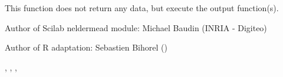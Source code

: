 %
\begin{Value}
This function does not return any data, but execute the output function(s).
\end{Value}
%
\begin{Author}\relax
Author of Scilab neldermead module: Michael Baudin (INRIA - Digiteo)

Author of R adaptation: Sebastien Bihorel ()
\end{Author}
%
\begin{SeeAlso}\relax
{},
,
,
\end{SeeAlso}
